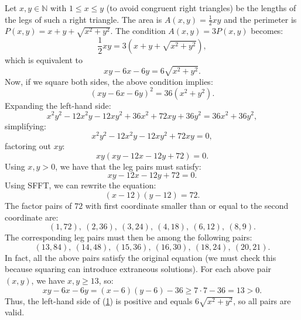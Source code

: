 \begin{solution}
    Let \( x, y \in \mathbb{N} \) with \( 1 \leq x \leq y \) (to avoid congruent right triangles) be the lengths of the legs of such a right triangle. The area is \( A\left( x, y \right) = \frac{1}{2}xy \) and the perimeter is \( P\left( x, y \right) = x + y + \sqrt{x^{2} + y^{2}} \). The condition \( A\left( x, y \right) = 3P\left( x, y \right) \) becomes:
    \[
        \frac{1}{2}xy = 3\left( x + y + \sqrt{x^{2} + y^{2}} \right),
    \]
    which is equivalent to
    \begin{equation}
        \label{1} xy - 6x - 6y = 6\sqrt{x^{2} + y^{2}}.
    \end{equation}
    Now, if we square both sides, the above condition implies:
    \[
        \left( xy - 6x - 6y \right)^{2} = 36\left( x^{2} + y^{2} \right).
    \]
    Expanding the left-hand side:
    \[
        x^{2}y^{2} - 12x^{2}y - 12xy^{2} + 36x^{2} + 72xy + 36y^{2} = 36x^{2} + 36y^{2},
    \]
    simplifying:
    \[
        x^{2}y^{2} - 12x^{2}y - 12xy^{2} + 72xy = 0,
    \]
    factoring out \( xy \):
    \[
        xy\left( xy - 12x - 12y + 72 \right) = 0.
    \]
    Using \( x, y > 0 \), we have that the leg pairs must satisfy:
    \[
        xy - 12x - 12y + 72 = 0.
    \]
    Using SFFT, we can rewrite the equation:
    \[
        \left( x - 12 \right)\left( y - 12 \right) = 72.
    \]
    The factor pairs of \( 72 \) with first coordinate smaller than or equal to the second coordinate are:
    \[
        \left( 1, 72 \right),\ \left( 2, 36 \right),\ \left( 3, 24 \right),\ \left( 4, 18 \right),\ \left( 6, 12 \right),\ \left( 8, 9 \right).
    \]
    The corresponding leg pairs must then be among the following pairs:
    \[
        \left( 13, 84 \right),\ \left( 14, 48 \right),\ \left( 15, 36 \right),\ \left( 16, 30 \right),\ \left( 18, 24 \right),\ \left( 20, 21 \right).
    \]
    In fact, all the above pairs satisfy the original equation (we must check this because squaring can introduce extraneous solutions). For each above pair \( \left( x, y \right) \), we have \( x, y \geq 13 \), so:
    \[
        xy - 6x - 6y = \left( x - 6 \right)\left( y - 6 \right) - 36 \geq 7 \cdot 7 - 36 = 13 > 0.
    \]
    Thus, the left-hand side of (\hyperref[1]{1}) is positive and equals \( 6\sqrt{x^{2} + y^{2}} \), so all pairs are valid.


\end{solution}
